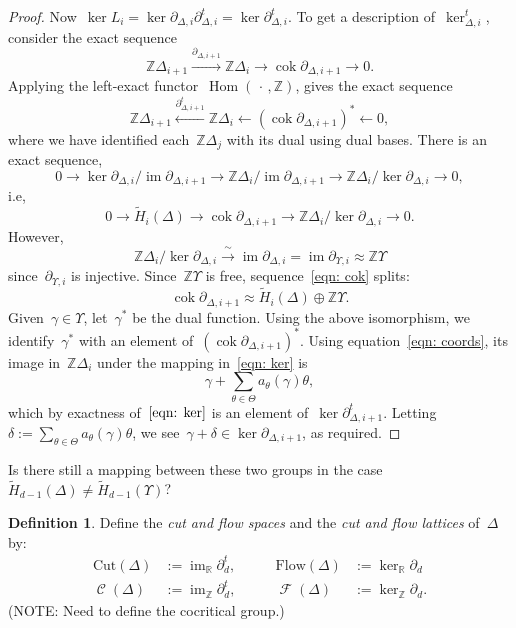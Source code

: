 \documentclass[12pt]{article}
\newcommand{\Z}{\mathbb{Z}}
\newcommand{\R}{\mathbb{R}}
\newcommand{\tH}{\widetilde{H}}
\DeclareMathOperator{\im}{\mathrm{im}}
\DeclareMathOperator{\Hom}{\mathrm{Hom}}
\DeclareMathOperator{\cut}{\mathcal{C}}
\DeclareMathOperator{\flow}{\mathcal{F}}
\DeclareMathOperator{\cok}{\mathrm{cok}}
\theoremstyle{definition}
\newtheorem{definition}[theorem]{Definition}
\theoremstyle{remark}
\begin{document}
\begin{proof}
  Now~$\ker L_i=\ker
  \partial_{\Delta,i}\partial_{\Delta,i}^t=\ker\partial_{\Delta,i}^t$. To get a
  description of~$\ker_{\Delta,i}^t$, consider the exact sequence
  \[
    \Z\Delta_{i+1}\xrightarrow{\partial_{\Delta,i+1}}\Z\Delta_i\to\cok\partial_{\Delta,i+1}\to0.
  \]
  Applying the left-exact functor~$\Hom(\,\cdot\,,\Z)$, gives the exact sequence
  \begin{equation}\label{eqn: ker}
    \Z\Delta_{i+1}\xleftarrow{\partial_{\Delta,i+1}^t}\Z\Delta_i\leftarrow(\cok\partial_{\Delta,i+1})^*\leftarrow0,
  \end{equation}
  where we have identified each~$\Z\Delta_{j}$ with its dual using dual bases.
  There is an exact sequence,
  \[
    0\to\ker\partial_{\Delta,i}/\im\partial_{\Delta,i+1}\to\Z\Delta_i/\im\partial_{\Delta,i+1}
    \to\Z\Delta_i/\ker\partial_{\Delta,i}\to0,
  \]
  i.e,
  \begin{equation}\label{eqn: cok}
    0\to\tH_i(\Delta)\to\cok\partial_{\Delta,i+1}\to\Z\Delta_i/\ker\partial_{\Delta,i}\to0.
  \end{equation}
  However,
  \[
    \Z\Delta_i/\ker\partial_{\Delta,i}\xrightarrow{\ \sim\ }\im\partial_{\Delta,i}=\im\partial_{\Upsilon,i}\approx\Z\Upsilon
  \]
  since~$\partial_{\Upsilon,i}$ is injective.  Since~$\Z\Upsilon$ is free,
  sequence~\eqref{eqn: cok} splits:
  \[
    \cok\partial_{\Delta,i+1}\approx\tH_i(\Delta)\oplus\Z\Upsilon.
  \]
  Given~$\gamma\in\Upsilon$, let~$\gamma^*$ be the dual function.  Using the
  above isomorphism, we identify~$\gamma^*$ with an
  element of~$(\cok\partial_{\Delta,i+1})^*$.  Using equation~\eqref{eqn:
  coords}, its image in~$\Z\Delta_i$ under the mapping in~\eqref{eqn: ker} is
  \[
    \gamma+\sum_{\theta\in\Theta}a_{\theta}(\gamma)\theta,
  \]
  which by exactness of~$\eqref{eqn: ker}$ is an element
  of~$\ker\partial_{\Delta,i+1}^t$.
  Letting~$\delta:=\sum_{\theta\in\Theta}a_{\theta}(\gamma)\theta$, we
  see~$\gamma+\delta\in\ker\partial_{\Delta,i+1}$, as required.
\end{proof}

  Is there still a mapping between these two groups in
the case~$\tH_{d-1}(\Delta)\neq\tH_{d-1}(\Upsilon)$?

\begin{definition}  Define the {\em cut and flow spaces} and the {\em cut and
  flow lattices} of~$\Delta$ by:
  \begin{align*}
    \mathrm{Cut}(\Delta)&:=\im_{\R}\partial_d^{t}, &\mathrm{Flow}(\Delta)&:=\ker_{\R}\partial_d\\
    \cut(\Delta)&:=\im_{\Z}\partial_d^{t},\qquad
    &\flow(\Delta)&:=\ker_{\Z}\partial_d.
  \end{align*}
  (NOTE: Need to define the cocritical group.)
\end{definition}
\end{document}
